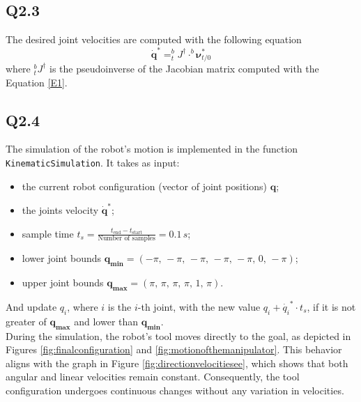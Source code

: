 \subsection{Q2.3}
The desired joint velocities are computed with the following equation
\begin{equation*}
	\dot{\mathbf{q}}^* = ^b_t J ^\dagger \cdot ^b \boldsymbol\nu^*_{t/0}
\end{equation*}
where $^b_t J ^\dagger$ is the pseudoinverse of the Jacobian matrix computed with the Equation \ref{E1}.

\subsection{Q2.4}
The simulation of the robot's motion is implemented in the function \verb*|KinematicSimulation|. It takes as input: 
\begin{itemize}
	\item the current robot configuration (vector of joint positions) $\mathbf{q}$;
	\item the joints velocity $\dot{\mathbf{q}}^*$;
	\item sample time $t_{s} = \frac{t_{\text{end}} - t_{\text{start}}}{\text{Number of samples}} = 0.1 \,s$;
	\item lower joint bounds $\mathbf{q_{\text{min}}} = (-\pi,\, -\pi,\,-\pi,\,-\pi,\,-\pi,\, 0,\, -\pi)$;
	\item upper joint bounds $\mathbf{q_{\text{max}}} = (\pi,\,\pi,\,\pi,\,\pi,\, 1,\, \pi)$.
\end{itemize}
And update $q_{i}$, where $i$ is the $i$-th joint, with the new value $q_{i} + \dot{q_{i}}^* \cdot t_{s}$, if it is not greater of $\mathbf{q_{\text{max}}}$ and lower than $\mathbf{q_{\text{min}}}$. \\
During the simulation, the robot’s tool moves directly to the goal, as depicted in Figures \ref{fig:finalconfiguration} and \ref{fig:motionofthemanipulator}. This behavior aligns with the graph in Figure \ref{fig:directionvelocitiesee}, which shows that both angular and linear velocities remain constant. Consequently, the tool configuration undergoes continuous changes without any variation in velocities.

